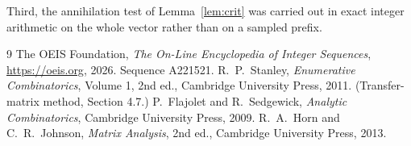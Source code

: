 \documentclass[11pt,a4paper]{article}
\theoremstyle{plain}
\theoremstyle{definition}
\begin{document}
Third, the annihilation test of Lemma~\ref{lem:crit} was carried out in exact integer
arithmetic on the whole vector rather than on a sampled prefix.

\begin{thebibliography}{9}
 The OEIS Foundation, \emph{The On-Line Encyclopedia of Integer
Sequences}, \url{https://oeis.org}, 2026. Sequence A221521.
 R.~P.~Stanley, \emph{Enumerative Combinatorics}, Volume 1, 2nd ed.,
Cambridge University Press, 2011. (Transfer-matrix method, Section 4.7.)
 P.~Flajolet and R.~Sedgewick, \emph{Analytic Combinatorics}, Cambridge
University Press, 2009.
 R.~A.~Horn and C.~R.~Johnson, \emph{Matrix Analysis}, 2nd ed., Cambridge
University Press, 2013.
\end{thebibliography}
\end{document}
